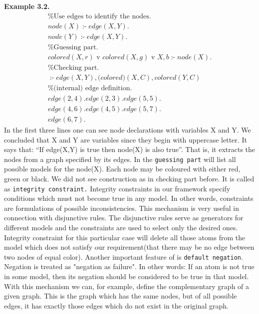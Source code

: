 \documentclass[14pt,a4paper, titlepage]{article}
\DeclareMathOperator{\leftimpl}{:-}
\begin{document}
\textbf{Example 3.2.}
\begin{align*}
&\% \text{Use edges to identify the nodes.}\\
&\mathit{node}(X) \leftimpl \mathit{edge}(X, Y). &\\
&\mathit{node}(Y) \leftimpl \mathit{edge}(X, Y). & \\
&\% \text{Guessing part.} \\
&\mathit{colored}(X, r) \text{ v } \mathit{colored}(X, g) \text{ v } \mathit{X, b} \leftimpl \mathit{node}(X). & \\
&\% \text{Checking part.} \\
&\leftimpl \mathit{edge}(X, Y), \mathit(colored)(X, C), \mathit{colored}(Y, C) & \\
&\% \text{(internal) edge definition.} \\
&\mathit{edge}(2, 4). \mathit{edge}(2, 3). \mathit{edge}(5, 5). & \\
&\mathit{edge}(4, 6). \mathit{edge}(4, 5). \mathit{edge}(5, 7). & \\
&\mathit{edge}(6, 7). &
\end{align*} 
In the first three lines one can see node declarations with variables X and Y. We concluded that X and Y are variables since they begin with uppercase letter. It says that: \enquote{If edge(X,Y) is true then node(X) is also true}. That is, it extracts the nodes from a graph specified by its edges. In the \texttt{guessing part} \dlvhex{} will list all possible models for the node(X). Each node may be coloured with either red, green or black. We did not see construction as in checking part before. It is called as \texttt{integrity constraint.} Integrity constraints in our framework specify conditions which must not become true in any model. In other words, constraints are formulations of possible inconsistencies. This mechanism is very useful in connection with disjunctive rules. The disjunctive rules serve as generators for different models and the constraints are used to select only the desired ones. Integrity constraint for this particular case will delete all those atoms from the model which does not satisfy our requirement(that there may be no edge between two nodes of equal color). Another important feature of \dlvhex{} is \texttt{default negation}. Negation is treated as "negation as failure". In other words: If an atom is not true in some model, then its negation should be considered to be true in that model. With this mechanism we can, for example, define the complementary graph of a given graph. This is the graph which has the same nodes, but of all possible edges, it has exactly those edges which do not exist in the original graph. \newpage
\end{document}
